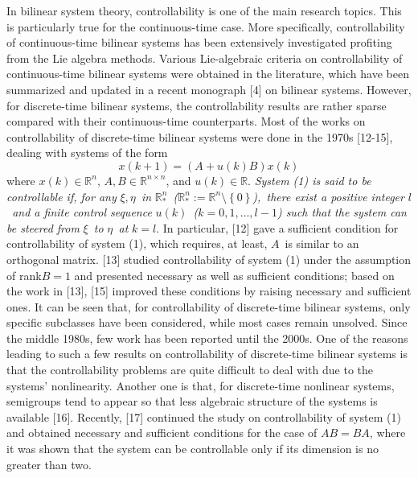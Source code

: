 \documentclass[journal,a4paper,12pt,onecolumn]{IEEEtran}
\begin{document}
In bilinear system theory, controllability is one of the main research
topics. This is particularly true for the continuous-time case. More
specifically, controllability of continuous-time bilinear systems has been
extensively investigated profiting from the Lie algebra methods. Various
Lie-algebraic criteria on controllability of continuous-time bilinear
systems were obtained in the literature, which have been summarized and
updated in a recent monograph [4] on bilinear systems. However, for
discrete-time bilinear systems, the controllability results are rather
sparse compared with their continuous-time counterparts. Most of the works
on controllability of discrete-time bilinear systems were done in the 1970s
[12-15], dealing with systems of the form\begin{equation}
x\left( k+1\right) =\left( A+u\left( k\right) B\right) x\left( k\right)
\end{equation}where $x(k)\in
\mathbb{R}
^{n}$, $A,B\in
\mathbb{R}
^{n\times n}$, and $u(k)\in
\mathbb{R}
$. \textit{System (1) is said to be controllable if, for any }$\xi ,\eta $\textit{\ in }$\mathbb{R}
_{\ast }^{n}$\textit{\ (}$\mathbb{R}
_{\ast }^{n}:=\mathbb{R}
^{n}\setminus \left\{ 0\right\} $\textit{),\ there exist a positive integer }$l$\textit{\ and a finite control sequence }$u(k)$\textit{\ (}$k=0,1,\ldots
,l-1$\textit{) such that the system can be steered from }$\xi $\textit{\ to }$\eta $\textit{\ at }$k=l$. In particular, [12] gave a sufficient condition
for controllability of system (1), which requires, at least, $A$\ is similar
to an orthogonal matrix. [13] studied controllability of system (1) under
the assumption of rank$B=1$ and presented necessary as well as sufficient
conditions; based on the work in [13], [15] improved these conditions by
raising necessary and sufficient ones. It can be seen that, for
controllability of discrete-time bilinear systems, only specific subclasses
have been considered, while most cases remain unsolved. Since the middle
1980s, few work has been reported until the 2000s. One of the reasons
leading to such a few results on controllability of discrete-time bilinear
systems is that the controllability problems are quite difficult to deal
with due to the systems' nonlinearity. Another one is that, for
discrete-time nonlinear systems, semigroups tend to appear so that less
algebraic structure of the systems is available [16]. Recently, [17]
continued the study on controllability of system (1) and obtained necessary
and sufficient conditions for the case of $AB=BA$, where it was shown that
the system can be controllable only if its dimension is no greater than two.
\end{document}
